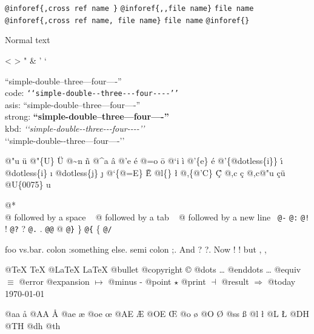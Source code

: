 \documentclass{book}
\begin{document}
\texttt{@inforef\{,cross ref name \}} 
\texttt{@inforef\{{,}{,}file name\}} \texttt{file name}
\texttt{@inforef\{,cross ref name,\ file name\}} \texttt{file name}
\texttt{@inforef\{\}} 



Normal text

<
>
"
\&
'
`

``simple-double--three---four----''\leavevmode{}\\
code: \texttt{{`}{`}simple-double{-}{-}three{-}{-}{-}four{-}{-}{-}-{'}{'}} \leavevmode{}\\
asis: ``simple-double--three---four----'' \leavevmode{}\\
strong: \textbf{``simple-double--three---four----''} \leavevmode{}\\
kbd: {\ttfamily\textsl{{`}{`}simple-double{-}{-}three{-}{-}{-}four{-}{-}{-}-{'}{'}}} \leavevmode{}\\

`\hbox{}`simple-double-\hbox{}-three---four----'\hbox{}'\leavevmode{}\\

%
%
%
%

@"u \"{u} 
@"\{U\} \"{U} 
@\~{}n \~{n}
@\^{}a \^{a}
@'e \'{e}
@=o \={o}
@`i \`{i}
@'\{e\} \'{e}
@'\{@dotless\{i\}\} \'{\i{}} 
@dotless\{i\} \i{}
@dotless\{j\} \j{}
@`\{@=E\} \`{\={E}} 
@l\{\} \l{}
@,\{@'C\} \c{\'{C}}
@,c \c{c}
@,c@"u \c{c}\"{u} \leavevmode{}\\

@U\{0075\} u

@* \leavevmode{}\\
@ followed by a space
\ {}
@ followed by a tab
\ {}
@ followed by a new line
\ {}\texttt{@-} \-{}
\texttt{@:} \@
\texttt{@!} \@!
\texttt{@?} \@?
\texttt{@.} \@.
\texttt{@@} @
\texttt{@\}} \}
\texttt{@\{} \{
\texttt{@/} 

foo vs.\@ bar. 
colon :\@And something else.
semi colon ;\@.
And ? ?\@.
Now ! !\@@
but , ,\@

@TeX \TeX{}
@LaTeX \LaTeX{}
@bullet \textbullet{}
@copyright \copyright{}
@dots \dots{}\@
@enddots \dots{}
@equiv $\equiv{}$
@error 
@expansion $\mapsto{}$
@minus -
@point $\star{}$
@print $\dashv{}$
@result $\Rightarrow{}$
@today \today{}

@aa \aa{}
@AA \AA{}
@ae \ae{}
@oe \oe{}
@AE \AE{}
@OE \OE{}
@o \o{}
@O \O{}
@ss \ss{}
@l \l{}
@L \L{}
@DH \DH{}
@TH \TH{}
@dh \dh{}
@th \th{}
\end{document}

